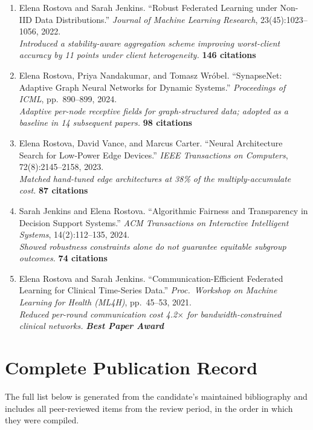 \begin{enumerate}[label={\lbrack P\arabic*\rbrack}, leftmargin=*, itemsep=0.5em]
  \item Elena Rostova and Sarah Jenkins. ``Robust Federated Learning under Non-IID Data Distributions.'' \emph{Journal of Machine Learning Research}, 23(45):1023--1056, 2022. \\{}
  \textit{Introduced a stability-aware aggregation scheme improving worst-client accuracy by 11 points under client heterogeneity.} \hfill{\color{gold}\textbf{146 citations}}

  \item Elena Rostova, Priya Nandakumar, and Tomasz Wr\'obel. ``SynapseNet: Adaptive Graph Neural Networks for Dynamic Systems.'' \emph{Proceedings of ICML}, pp.\ 890--899, 2024. \\{}
  \textit{Adaptive per-node receptive fields for graph-structured data; adopted as a baseline in 14 subsequent papers.} \hfill{\color{gold}\textbf{98 citations}}

  \item Elena Rostova, David Vance, and Marcus Carter. ``Neural Architecture Search for Low-Power Edge Devices.'' \emph{IEEE Transactions on Computers}, 72(8):2145--2158, 2023. \\{}
  \textit{Matched hand-tuned edge architectures at 38\% of the multiply-accumulate cost.} \hfill{\color{gold}\textbf{87 citations}}

  \item Sarah Jenkins and Elena Rostova. ``Algorithmic Fairness and Transparency in Decision Support Systems.'' \emph{ACM Transactions on Interactive Intelligent Systems}, 14(2):112--135, 2024. \\{}
  \textit{Showed robustness constraints alone do not guarantee equitable subgroup outcomes.} \hfill{\color{gold}\textbf{74 citations}}

  \item Elena Rostova and Sarah Jenkins. ``Communication-Efficient Federated Learning for Clinical Time-Series Data.'' \emph{Proc.\ Workshop on Machine Learning for Health (ML4H)}, pp.\ 45--53, 2021. \\{}
  \textit{Reduced per-round communication cost 4.2$\times$ for bandwidth-constrained clinical networks.} \hfill{\color{gold}\textbf{\emph{Best Paper Award}}}
\end{enumerate}

\section{Complete Publication Record}
The full list below is generated from the candidate's maintained bibliography and includes all peer-reviewed items from the review period, in the order in which they were compiled.

\nocite{*}

